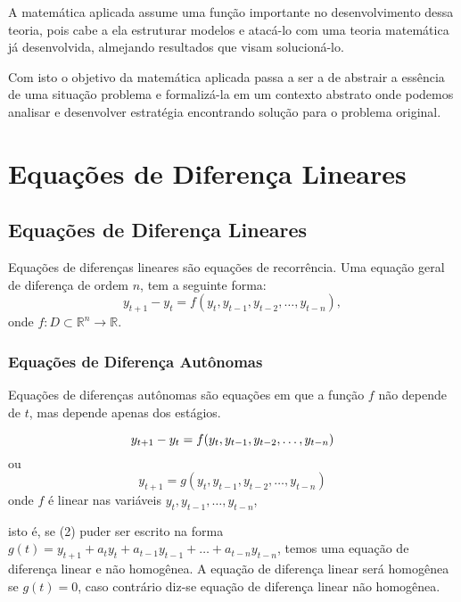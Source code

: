 A matemática aplicada assume uma função importante no desenvolvimento dessa teoria, pois cabe a ela estruturar modelos e atacá-lo com uma teoria matemática já desenvolvida, almejando resultados que visam solucioná-lo.

Com isto o objetivo da matemática aplicada passa a ser a de abstrair a essência de uma situação problema e formalizá-la em um contexto abstrato onde podemos analisar e desenvolver estratégia encontrando solução para o problema original. 


\chapter{Equações de Diferença Lineares}

\section{Equações de Diferença Lineares}

\begin{definition}
Equações de diferenças lineares são equações de recorrência. Uma equação geral de diferença de ordem \(n\), tem a seguinte forma:
\begin{equation}\label{eq:equacaofegaldiferencaondemn}
y_{t+1} - y_{t} = f(y_{t}, y_{t-1}, y_{t-2}, \ldots, y_{t-n}),
\end{equation}
onde \(f: D \subset  \mathbb{R}^n \to \mathbb{R}\).
\end{definition}

\subsection{Equações de Diferença Autônomas}

\begin{definition}
Equações de diferenças autônomas são equações em que a função \(f\) não depende de \(t\), mas depende apenas dos estágios. 

\begin{equation}\label{eq:equacoesdiferençasautonomas1}
y_{t+1} - y_{t} = f(y_{t}, y_{t-1}, y_{t-2}, \ldots, y_{t-n}) \\ 
\end{equation}
ou
\begin{equation}\label{eq:equacoesdiferençasautonomas2}
y_{t+1} = g(y_{t}, y_{t-1}, y_{t-2}, \ldots, y_{t-n})
\end{equation}
onde \(f\) é linear nas variáveis \(y_{t}, y_{t-1}, \ldots, y_{t-n}\),
\end{definition}
isto é, se (2) puder ser escrito na forma \(g(t) = y_{t+1}+a_ty_{t}+a_{t-1}y_{t-1}+\ldots+a_{t-n}y_{t-n}\), temos uma equação de diferença linear e não homogênea. A equação de diferença linear será homogênea se \(g(t)=0\), caso contrário diz-se equação de diferença linear não homogênea. 


